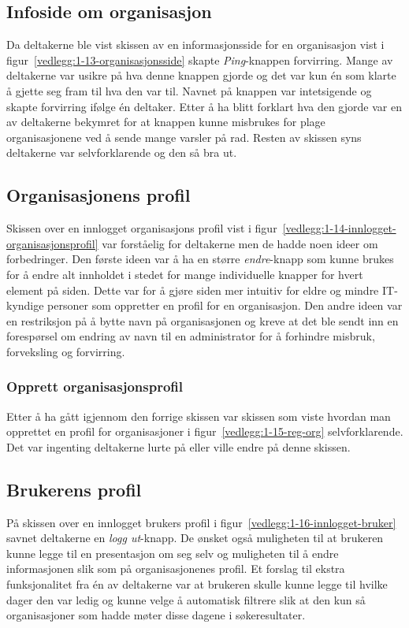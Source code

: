 \subsection{Infoside om organisasjon}

Da deltakerne ble vist skissen av en informasjonsside for en organisasjon vist i figur~\ref{vedlegg:1-13-organisasjonsside} skapte {\em Ping}-knappen forvirring. Mange av deltakerne var usikre på hva denne knappen gjorde og det var kun én som klarte å gjette seg fram til hva den var til. Navnet på knappen var intetsigende og skapte forvirring ifølge én deltaker. Etter å ha blitt forklart hva den gjorde var en av deltakerne bekymret for at knappen kunne misbrukes for plage organisasjonene ved å sende mange varsler på rad. Resten av skissen syns deltakerne var selvforklarende og den så bra ut. 


\subsection{Organisasjonens profil}

Skissen over en innlogget organisasjons profil vist i figur~\ref{vedlegg:1-14-innlogget-organisasjonsprofil} var forståelig for deltakerne men de hadde noen ideer om forbedringer. Den første ideen var å ha en større {\em endre}-knapp som kunne brukes for å endre alt innholdet i stedet for mange individuelle knapper for hvert element på siden. Dette var for å gjøre siden mer intuitiv for eldre og mindre IT-kyndige personer som oppretter en profil for en  organisasjon. Den andre ideen var en restriksjon på å bytte navn på organisasjonen og kreve at det ble sendt inn en forespørsel om endring av navn til en administrator for å forhindre misbruk, forveksling og forvirring.

\subsubsection{Opprett organisasjonsprofil}

Etter å ha gått igjennom den forrige skissen var skissen som viste hvordan man opprettet en profil for organisasjoner i figur~\ref{vedlegg:1-15-reg-org} selvforklarende. Det var ingenting deltakerne lurte på eller ville endre på denne skissen.

\subsection{Brukerens profil}

På skissen over en innlogget brukers profil i figur~\ref{vedlegg:1-16-innlogget-bruker} savnet deltakerne en {\em logg ut}-knapp. De ønsket også muligheten til at brukeren kunne legge til en presentasjon om seg selv og muligheten til å endre informasjonen slik som på organisasjonenes profil. Et forslag til ekstra funksjonalitet fra én av deltakerne var at brukeren skulle kunne legge til hvilke dager den var ledig og kunne velge å automatisk filtrere slik at den kun så organisasjoner som hadde møter disse dagene i søkeresultater.


